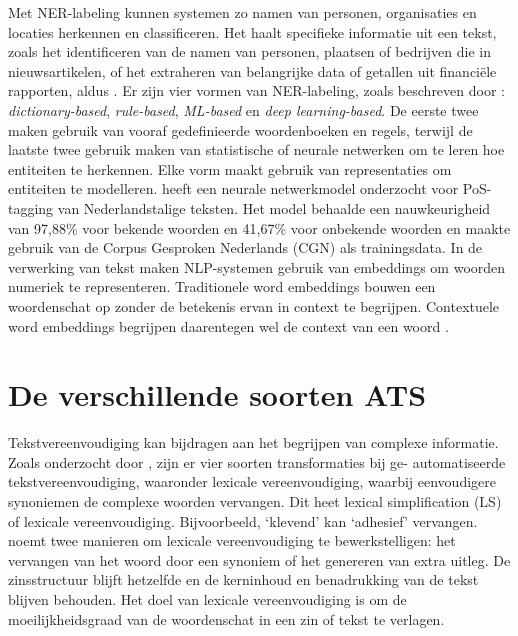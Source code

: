 Met NER-labeling kunnen systemen zo namen van personen, organisaties en locaties herkennen en classificeren. Het haalt specifieke informatie uit een tekst, zoals het identificeren van de namen van personen, plaatsen of bedrijven die in nieuwsartikelen, of het extraheren van belangrijke data of getallen uit financiële rapporten, aldus \textcite{Jurafsky2014}. Er zijn vier vormen van NER-labeling, zoals beschreven door \textcite{Li2018}: \textit{dictionary-based}, \textit{rule-based}, \textit{ML-based} en \textit{deep learning-based}. De eerste twee maken gebruik van vooraf gedefinieerde woordenboeken en regels, terwijl de laatste twee gebruik maken van statistische of neurale netwerken om te leren hoe entiteiten te herkennen. Elke vorm maakt gebruik van representaties om entiteiten te modelleren. \textcite{Poel2008} heeft een neurale netwerkmodel onderzocht voor PoS-tagging van Nederlandstalige teksten. Het model behaalde een nauwkeurigheid van 97,88\% voor bekende woorden en 41,67\% voor onbekende woorden en maakte gebruik van de Corpus Gesproken Nederlands (CGN) als trainingsdata. In de verwerking van tekst maken NLP-systemen gebruik van embeddings om woorden numeriek te representeren. Traditionele word embeddings bouwen een woordenschat op zonder de betekenis ervan in context te begrijpen. Contextuele word embeddings begrijpen daarentegen wel de context van een woord \autocite{Eisenstein2019}. 

\section{De verschillende soorten ATS}

Tekstvereenvoudiging kan bijdragen aan het begrijpen van complexe informatie. Zoals onderzocht door \textcite{Siddharthan2014}, zijn er vier soorten transformaties bij ge- automatiseerde tekstvereenvoudiging, waaronder lexicale vereenvoudiging, waarbij eenvoudigere synoniemen de complexe woorden vervangen. Dit heet lexical simplification (LS) of lexicale vereenvoudiging. Bijvoorbeeld, ‘klevend’ kan ‘adhesief’ vervangen. \textcite{Kandula2010} noemt twee manieren om lexicale vereenvoudiging te bewerkstelligen: het vervangen van het woord door een synoniem of het genereren van extra uitleg. De zinsstructuur blijft hetzelfde en de kerninhoud en benadrukking van de tekst blijven behouden. Het doel van lexicale vereenvoudiging is om de moeilijkheidsgraad van de woordenschat in een zin of tekst te verlagen.

\medspace

